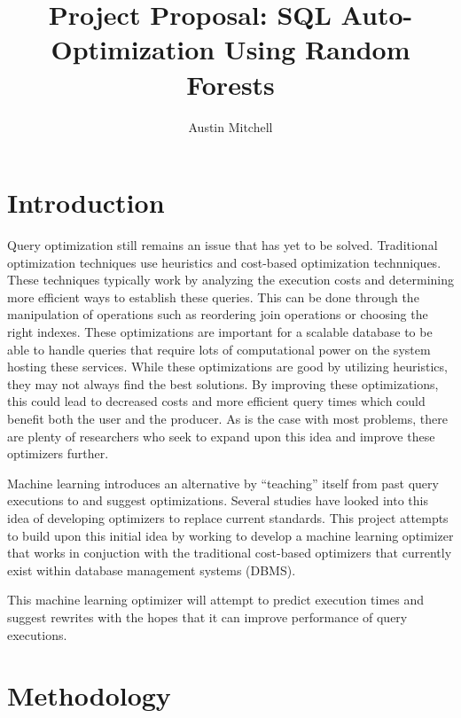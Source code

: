 \documentclass[sigconf]{acmart}
\title{Project Proposal: SQL Auto-Optimization Using Random Forests}
\author{Austin Mitchell}
\affiliation{%
  \institution{Georgia Institute of Technology}
  \city{Atlanta, GA}
  \country{United States}
}
\begin{document}
\maketitle

\section{Introduction}
Query optimization still remains an issue that has yet to be solved.
Traditional optimization techniques use heuristics and cost-based optimization technniques.
These techniques typically work by analyzing the execution costs and determining more efficient ways to establish these queries.
This can be done through the manipulation of operations such as reordering join operations or choosing the right indexes. These optimizations
are important for a scalable database to be able to handle queries that require lots of computational power on the system hosting these services.
While these optimizations are good by utilizing heuristics, they may not always find the best solutions.
By improving these optimizations, this could lead to decreased costs and more efficient query times which could benefit both the user
and the producer. As is the case with most problems, there are plenty of researchers who seek to expand upon this idea and improve these
optimizers further.

Machine learning introduces an alternative by ``teaching'' itself from past query executions to and suggest optimizations.
Several studies have looked into this idea of developing optimizers to replace current standards\cite{Marcus_2019}\cite{mlcomparative2024}.
This project attempts to build upon this initial idea by working to develop a machine learning optimizer that works in conjuction with the
traditional cost-based optimizers that currently exist within database management systems (DBMS).

This machine learning optimizer will attempt to predict execution times and suggest rewrites with the hopes that it can improve performance
of query executions.

\section{Methodology}
\end{document}
